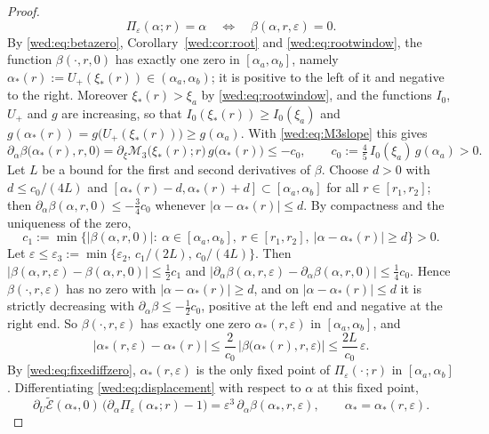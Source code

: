 \begin{proof}
\begin{equation}\label{wed:eq:fixediffzero}
\Pi_\varepsilon(\alpha;r)=\alpha\quad\Longleftrightarrow\quad\beta(\alpha,r,\varepsilon)=0 .
\end{equation}
By \eqref{wed:eq:betazero}, Corollary~\ref{wed:cor:root} and \eqref{wed:eq:rootwindow}, the function $\beta(\cdot,r,0)$ has exactly one zero in $[\alpha_a,\alpha_b]$, namely $\alpha_*(r):=U_+(\xi_*(r))\in(\alpha_a,\alpha_b)$; it is positive to the left of it and negative to the right. Moreover $\xi_*(r)>\xi_a$ by \eqref{wed:eq:rootwindow}, and the functions $I_0$, $U_+$ and $g$ are increasing, so that $I_0(\xi_*(r))\ge I_0(\xi_a)$ and $g(\alpha_*(r))=g\bigl(U_+(\xi_*(r))\bigr)\ge g(\alpha_a)$. With \eqref{wed:eq:M3slope} this gives
\[
\partial_\alpha\beta\bigl(\alpha_*(r),r,0\bigr)=\partial_\xi\mathcal M_3\bigl(\xi_*(r);r\bigr)\,g\bigl(\alpha_*(r)\bigr)\le-c_0,\qquad c_0:=\tfrac45\,I_0(\xi_a)\,g(\alpha_a)>0 .
\]
Let $L$ be a bound for the first and second derivatives of $\beta$. Choose $d>0$ with $d\le c_0/(4L)$ and $[\alpha_*(r)-d,\alpha_*(r)+d]\subset[\alpha_a,\alpha_b]$ for all $r\in[r_1,r_2]$; then $\partial_\alpha\beta(\alpha,r,0)\le-\tfrac34c_0$ whenever $|\alpha-\alpha_*(r)|\le d$. By compactness and the uniqueness of the zero,
\[
c_1:=\min\bigl\{|\beta(\alpha,r,0)|:\ \alpha\in[\alpha_a,\alpha_b],\ r\in[r_1,r_2],\ |\alpha-\alpha_*(r)|\ge d\bigr\}>0 .
\]
Let $\varepsilon\le\varepsilon_3:=\min\{\varepsilon_2,\,c_1/(2L),\,c_0/(4L)\}$. Then $|\beta(\alpha,r,\varepsilon)-\beta(\alpha,r,0)|\le\tfrac12c_1$ and $|\partial_\alpha\beta(\alpha,r,\varepsilon)-\partial_\alpha\beta(\alpha,r,0)|\le\tfrac14c_0$. Hence $\beta(\cdot,r,\varepsilon)$ has no zero with $|\alpha-\alpha_*(r)|\ge d$, and on $|\alpha-\alpha_*(r)|\le d$ it is strictly decreasing with $\partial_\alpha\beta\le-\tfrac12c_0$, positive at the left end and negative at the right end. So $\beta(\cdot,r,\varepsilon)$ has exactly one zero $\alpha_*(r,\varepsilon)$ in $[\alpha_a,\alpha_b]$, and
\begin{equation}\label{wed:eq:zeroshift}
\bigl|\alpha_*(r,\varepsilon)-\alpha_*(r)\bigr|\le\frac{2}{c_0}\,\bigl|\beta\bigl(\alpha_*(r),r,\varepsilon\bigr)\bigr|\le\frac{2L}{c_0}\,\varepsilon .
\end{equation}
By \eqref{wed:eq:fixediffzero}, $\alpha_*(r,\varepsilon)$ is the only fixed point of $\Pi_\varepsilon(\cdot\,;r)$ in $[\alpha_a,\alpha_b]$. Differentiating \eqref{wed:eq:displacement} with respect to $\alpha$ at this fixed point,
\[
\partial_U\tilde{\mathcal E}(\alpha_*,0)\,\bigl(\partial_\alpha\Pi_\varepsilon(\alpha_*;r)-1\bigr)=\varepsilon^3\,\partial_\alpha\beta(\alpha_*,r,\varepsilon),\qquad \alpha_*=\alpha_*(r,\varepsilon).
\]
\end{proof}
